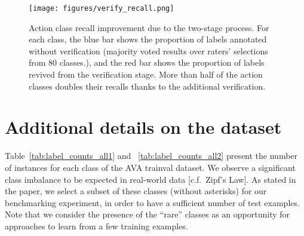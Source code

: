 \documentclass[10pt,twocolumn,letterpaper]{article}
\begin{document}
\begin{figure*}
\centering
\texttt{[image: figures/verify\_recall.png]}
\caption{Action class recall improvement due to the two-stage process. For each class, the blue bar shows the proportion of labels annotated without verification (majority voted results over raters' selections from 80 classes.), and the red bar shows the proportion of labels revived from the verification stage. More than half of the action classes doubles their recalls thanks to the additional verification.}
\label{fig:verify_recall}
\end{figure*}

\section{Additional details on the dataset}



Table~\ref{tab:label_counts_all1} and ~\ref{tab:label_counts_all2} present the number of instances for each class of the AVA trainval dataset. We observe a significant class imbalance to be expected in real-world data [c.f.\ Zipf's Law]. As stated in the paper, we select a subset of these classes (without asterisks) for our benchmarking experiment, in order to have a sufficient number of test examples. Note that we consider the presence of the ``rare'' classes as an opportunity for approaches to learn from a few training examples. 
\end{document}
